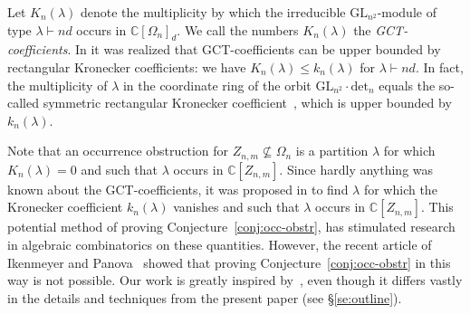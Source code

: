 \documentclass[11pt]{amsart}
\def\C{\mathbb{C}}
\def\det{\mathrm{det}}
\def\GL{\mathrm{GL}}
\def\la{\lambda}
\newcommand{\kron}{k}
\newcommand{\gctm}{K}
\numberwithin{equation}{section}
\begin{document}
Let $\gctm_n(\la)$ denote the multiplicity by which the irreducible $\GL_{n^2}$-module of type 
$\la\vdash nd$ occurs in $\C[\Omega_n]_d$. 
We call the numbers $\gctm_n(\la)$ the {\em GCT-coefficients}.   
In \cite{gct1} it was realized that GCT-coefficients 
can be upper bounded by rectangular Kronecker coefficients:
we have $\gctm_n(\la) \le \kron_n(\la)$ for $\la\vdash nd$. 
In fact, the multiplicity of $\la$ in the coordinate ring of the orbit 
$\GL_{n^2}\cdot\det_n$ equals the so-called symmetric 
rectangular Kronecker coefficient~\cite{BLMW:11}, which is  
upper bounded by $\kron_n(\la)$. 

Note that an occurrence obstruction for 
$Z_{n,m}\not\subseteq\Omega_n$ 
is a partition $\la$ for which  $\gctm_n(\la)=0$ 
and such that $\la$ occurs in $\C[Z_{n,m}]$. 
Since hardly anything was known about the GCT-coefficients, 
it was proposed in \cite{gct1} to find $\la$ 
for which the Kronecker coefficient $k_n(\la)$ vanishes 
and such that $\la$ occurs in $\C[Z_{n,m}]$. 
This potential method of proving Conjecture~\ref{conj:occ-obstr},
has stimulated research in algebraic combinatorics on these quantities. 
However, the recent article of Ikenmeyer and Panova~\cite{ik-panova:15} showed that 
proving Conjecture~\ref{conj:occ-obstr} in this way is not possible. 
Our work is greatly inspired by~\cite{ik-panova:15}, even though 
it differs vastly in the details and techniques from the present paper
(see \S\ref{se:outline}). 



\end{document}
